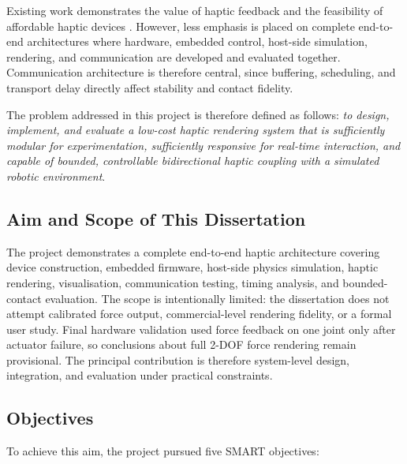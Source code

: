 Existing work demonstrates the value of haptic feedback and the feasibility of affordable haptic devices \cite{martinez3DPrintedHaptic2016,martinezOpenSourceModular2017,lavatelliDesignOpenSource2014}. However, less emphasis is placed on complete end-to-end architectures where hardware, embedded control, host-side simulation, rendering, and communication are developed and evaluated together. Communication architecture is therefore central, since buffering, scheduling, and transport delay directly affect stability and contact fidelity.

The problem addressed in this project is therefore defined as follows: \emph{to design, implement, and evaluate a low-cost haptic rendering system that is sufficiently modular for experimentation, sufficiently responsive for real-time interaction, and capable of bounded, controllable bidirectional haptic coupling with a simulated robotic environment}.

\subsection{Aim and Scope of This Dissertation}

The project demonstrates a complete end-to-end haptic architecture covering device construction, embedded firmware, host-side physics simulation, haptic rendering, visualisation, communication testing, timing analysis, and bounded-contact evaluation. The scope is intentionally limited: the dissertation does not attempt calibrated force output, commercial-level rendering fidelity, or a formal user study. Final hardware validation used force feedback on one joint only after actuator failure, so conclusions about full 2-DOF force rendering remain provisional. The principal contribution is therefore system-level design, integration, and evaluation under practical constraints.

\subsection{Objectives}

To achieve this aim, the project pursued five SMART objectives:

